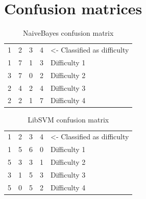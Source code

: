 \documentclass[11pt,leqno,a4paper]{report} %
\begin{document}
\pagebreak

\section{Confusion matrices}

\begin{table}[h]
\caption {NaiveBayes confusion matrix} 
\center
\begin{tabular}{ccccl}
\multicolumn{1}{l}{1} & \multicolumn{1}{l}{2} & \multicolumn{1}{l}{3} & \multicolumn{1}{l}{4} & \small{\textless- Classified as difficulty} \\ \cline{1-4}
1                          & 7                          & 1                          & \multicolumn{1}{c|}{3}     & Difficulty 1                    \\
3                          & 7                          & 0                          & \multicolumn{1}{c|}{2}     & Difficulty 2                    \\
2                          & 4                          & 2                          & \multicolumn{1}{c|}{4}     & Difficulty 3                    \\
2                          & 2                          & 1                          & \multicolumn{1}{c|}{7}     & Difficulty 4                   
\end{tabular}
\end{table}




\begin{table}[h]
\caption {LibSVM confusion matrix} 
\center
\begin{tabular}{ccccl}
\multicolumn{1}{l}{1} & \multicolumn{1}{l}{2} & \multicolumn{1}{l}{3} & \multicolumn{1}{l}{4} & \small{\textless- Classified as difficulty} \\ \cline{1-4}
1                          & 5                          & 6                          & \multicolumn{1}{c|}{0}     & Difficulty 1                    \\
5                          & 3                          & 3                          & \multicolumn{1}{c|}{1}     & Difficulty 2                    \\
3                          & 1                          & 5                          & \multicolumn{1}{c|}{3}     & Difficulty 3                    \\
5                          & 0                          & 5                          & \multicolumn{1}{c|}{2}     & Difficulty 4                   
\end{tabular}
\end{table}
\end{document}
